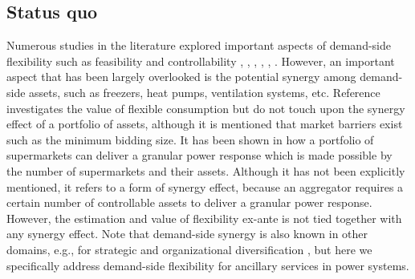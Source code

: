 \documentclass[conference]{IEEEtran}
\begin{document}

\vspace{1mm}
\subsection{Status quo}
\vspace{-1mm}
Numerous studies in the literature explored important aspects of demand-side flexibility such as feasibility and controllability \cite{bondy2018redefining}, \cite{bondy2017performance}, \cite{bondy2016procedure}, \cite{bondy2014performance}, \cite{biegel2014integration}, \cite{AchievingControllabilityofElectricLoads}. However, an important aspect that has been largely overlooked is the potential synergy among demand-side assets, such as freezers, heat pumps, ventilation systems, etc.
%
Reference \cite{biegel2014value} investigates the value of flexible consumption but do not touch upon the synergy effect of a portfolio of assets, although it is mentioned that market barriers exist such as the minimum bidding size.
%
It has been shown in \cite{pedersen2014aggregation} how a portfolio of supermarkets can deliver a granular power response which is made possible by the number of supermarkets and their assets. Although it has not been explicitly mentioned, it refers to a form of synergy effect, because an aggregator requires a certain number of controllable assets to deliver a granular power response. However, the estimation and value of flexibility ex-ante is not tied together with any synergy effect. Note that  demand-side synergy is also known in other domains, e.g., for strategic and organizational diversification \cite{ye2012achieving}, but here we specifically address demand-side flexibility for ancillary services in power systems.
\end{document}
